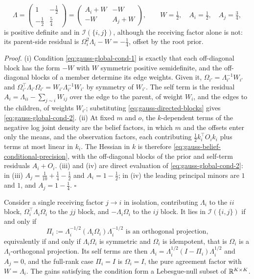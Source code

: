 \begin{equation}
\Lambda
=
\begin{pmatrix}
1&-\tfrac12\\[2pt]
-\tfrac12&\tfrac54
\end{pmatrix}
=
\begin{pmatrix}
A_i+W&-W\\[2pt]
-W&A_j+W
\end{pmatrix},
\qquad
W=\tfrac12,\quad A_i=\tfrac12,\quad A_j=\tfrac34,
\label{eq:gauss-global-cancellation-witness}
\end{equation}
is positive definite and in \(\mathcal I(\{i,j\})\), although the receiving
factor alone is not: its parent-side residual is
\(\Omega_i^2\Lambda_i-W=-\tfrac14\), offset by the root prior.

\noindent\emph{Proof.}
(i) Condition \eqref{eq:gauss-global-cond-1} is exactly that each off-diagonal
block has the form \(-W\) with \(W\) symmetric positive semidefinite, and the
off-diagonal blocks of a member determine its edge weights. Given it,
\(\Omega_{i'}=\Lambda_{i'}^{-1}W_{i'}\) and
\(\Omega_{i'}^\top\Lambda_{i'}\Omega_{i'}=W_{i'}\Lambda_{i'}^{-1}W_{i'}\) by
symmetry of \(W_{i'}\). The self term is the residual
\(A_i=\Lambda_{ii}-\sum_{j\sim i}W_{ij}\) over the edge to the parent, of weight
\(W_i\), and the edges to the children, of weights \(W_{i'}\); substituting
\eqref{eq:gauss-directed-blocks} gives \eqref{eq:gauss-global-cond-2}.
(ii) At fixed \(m\) and \(o\), the \(k\)-dependent terms of the negative log
joint density are the belief factors, in which \(m\) and the offsets enter only
the means, and the observation factors, each contributing
\(\tfrac12k_i^\top O_ik_i\) plus terms at most linear in \(k_i\). The Hessian in
\(k\) is therefore \eqref{eq:gauss-belief-conditional-precision}, with the
off-diagonal blocks of the prior and self-term residuals \(A_i+O_i\).
(iii) and (iv) are direct evaluation of \eqref{eq:gauss-global-cond-2}: in
(iii) \(A_j=\tfrac1{10}+\tfrac14-\tfrac12\) and \(A_i=1-\tfrac12\); in (iv) the
leading principal minors are \(1\) and \(1\), and \(A_j=1-\tfrac14\). \(\square\)

Consider a single receiving factor \(j\to i\) in isolation, contributing
\(\Lambda_i\) to the \(ii\) block, \(\Omega_i^\top\Lambda_i\Omega_i\) to the
\(jj\) block, and \(-\Lambda_i\Omega_i\) to the \(ij\) block. It lies in
\(\mathcal I(\{i,j\})\) if and only if
\begin{equation}
\Pi_i:=\Lambda_i^{-1/2}\left(\Lambda_i\Omega_i\right)\Lambda_i^{-1/2}
\text{ is an orthogonal projection,}
\label{eq:gauss-edge-local}
\end{equation}
equivalently if and only if \(\Lambda_i\Omega_i\) is symmetric and
\(\Omega_i\) is idempotent, that is \(\Omega_i\) is a \(\Lambda_i\)-orthogonal
projection. Its self terms are then \(A_i=\Lambda_i^{1/2}(I-\Pi_i)\Lambda_i^{1/2}\)
and \(A_j=0\), and the full-rank case \(\Pi_i=I\) is \(\Omega_i=I\), the pure
agreement factor with \(W=\Lambda_i\). The gains satisfying the condition
form a Lebesgue-null subset of \(\mathbb R^{K\times K}\). 

